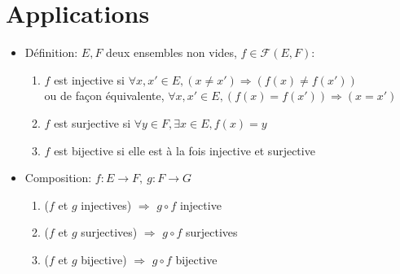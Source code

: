 \documentclass[fleqn]{article}
\begin{document}
\section{Applications}
\begin{itemize}
	\item D\'efinition: \(E, F\) deux ensembles non vides, \( f \in \mathcal{F}(E, F)\):
		\begin{enumerate}
			\item \(f\) est injective si \(\forall x,x' \in E, (x \neq x') \Rightarrow (f(x) \neq f(x'))\) \\
			ou de fa\c{c}on \'equivalente, \(\forall x,x' \in E, (f(x) = f(x')) \Rightarrow (x = x')\)
			\item \(f\) est surjective si \(\forall y \in F, \exists x \in E, f(x) = y\)
			\item \(f\) est bijective si elle est \`a la fois injective et surjective
		\end{enumerate}
	\item Composition: \(f: E \rightarrow F,\ g: F \rightarrow G\)
		\begin{enumerate}
			\item (\(f\) et \(g\) injectives) \(\Rightarrow\) \(g \circ f\) injective
			\item (\(f\) et \(g\) surjectives) \(\Rightarrow\) \(g \circ f\) surjectives
			\item (\(f\) et \(g\) bijective) \(\Rightarrow\) \(g \circ f\) bijective
		\end{enumerate}


\end{itemize}
\end{document}
